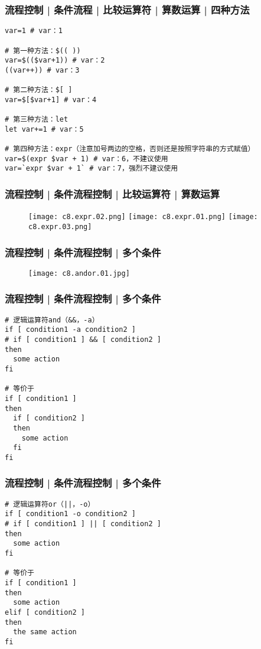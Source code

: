 \begin{frame}[fragile]
  \frametitle{流程控制 | 条件流程 | 比较运算符 | 算数运算 | \alert{四种方法}}
\begin{lstlisting}
var=1 # var：1

# 第一种方法：$(( ))
var=$(($var+1)) # var：2
((var++)) # var：3

# 第二种方法：$[ ]
var=$[$var+1] # var：4

# 第三种方法：let
let var+=1 # var：5

# 第四种方法：expr（注意加号两边的空格，否则还是按照字符串的方式赋值）
var=$(expr $var + 1) # var：6，不建议使用
var=`expr $var + 1` # var：7，强烈不建议使用
\end{lstlisting}
\end{frame}

\begin{frame}[fragile]
  \frametitle{流程控制 | 条件流程控制 | 比较运算符 | 算数运算}
  \begin{figure}
    \centering
    \texttt{[image: c8.expr.02.png]}
    \texttt{[image: c8.expr.01.png]}
    \vspace{0.3cm}
    \texttt{[image: c8.expr.03.png]}
  \end{figure}
\end{frame}

\begin{frame}
  \frametitle{流程控制 | 条件流程控制 | \alert{多个条件}}
  \begin{figure}
    \centering
    \texttt{[image: c8.andor.01.jpg]}
  \end{figure}
\end{frame}

\begin{frame}[fragile]
  \frametitle{流程控制 | 条件流程控制 | 多个条件}
\begin{lstlisting}
# 逻辑运算符and（&&，-a）
if [ condition1 -a condition2 ]
# if [ condition1 ] && [ condition2 ]
then
  some action
fi

# 等价于
if [ condition1 ]
then
  if [ condition2 ]
  then
    some action
  fi
fi
\end{lstlisting}
\end{frame}

\begin{frame}[fragile]
  \frametitle{流程控制 | 条件流程控制 | 多个条件}
\begin{lstlisting}
# 逻辑运算符or（||，-o）
if [ condition1 -o condition2 ]
# if [ condition1 ] || [ condition2 ]
then
  some action
fi

# 等价于
if [ condition1 ]
then
  some action
elif [ condition2 ]
then
  the same action
fi
\end{lstlisting}
\end{frame}

